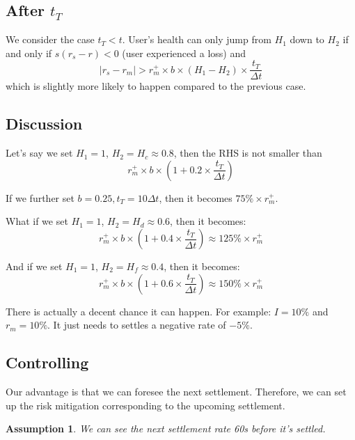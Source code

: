 \documentclass[notitlepage,reqno,11pt]{amsart}
\numberwithin{equation}{section}
\newtheorem{assumption}{Assumption}[section]
\begin{document}
\subsection{After $t_T$}
We consider the case $t_T <t$. User's health can only jump from $H_1$ down to $H_2$ if and only if $s(r_s-r) < 0$ (user experienced a loss) and 
$$
|r_s - r_m| > r_m^+\times b\times (H_1-H_2)\times\frac{t_T}{\Delta t}
$$
which is slightly more likely to happen compared to the previous case. 

\subsection{Discussion}

Let's say we set $H_1 =1$, $H_2 = H_c\approx 0.8$, then the RHS is not smaller than
$$
r_m^+\times b\times (1 + 0.2\times\frac{t_T}{\Delta t})
$$

If we further set $b=0.25,t_T = 10 \Delta t$, then it becomes $75\%\times r_m^+$. 

What if we set $H_1 =1$, $H_2 = H_d\approx 0.6$, then it becomes:
$$
r_m^+\times b\times (1 + 0.4\times\frac{t_T}{\Delta t}) \approx 125\%\times r_m^+
$$

And if we set $H_1 =1$, $H_2 = H_f\approx 0.4$, then it becomes:
$$
r_m^+\times b\times (1 + 0.6\times\frac{t_T}{\Delta t}) \approx 150\%\times r_m^+
$$

There is actually a decent chance it can happen. For example: $I = 10\%$ and $r_m = 10\%$. It just needs to settles a negative rate of $-5\%$.



\subsection{Controlling}
Our advantage is that we can foresee the next settlement. Therefore, we can set up the risk mitigation corresponding to the upcoming settlement. 

\begin{assumption}
    We can see the next settlement rate 60s before it's settled.
\end{assumption}
\end{document}
